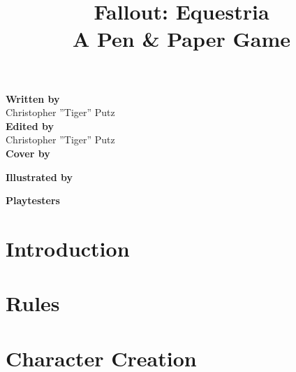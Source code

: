 \documentclass[twocolumn, 12pt]{book}
\title{Fallout: Equestria\\
		\large A Pen \& Paper Game}
\begin{document}
\maketitle

\onecolumn
\begin{center}
\textbf{\large Written by} \\ \normalsize
Christopher ''Tiger'' Putz \\

\vspace{14pt} \textbf{\large Edited by} \\ \normalsize
Christopher ''Tiger'' Putz \\

\vspace{14pt} \textbf{\large Cover by} \\ \normalsize

\vspace{14pt} \textbf{\large Illustrated by} \\ \normalsize

\vspace{14pt} \textbf{\large Playtesters} \\ \normalsize
 
\end{center}

\tableofcontents
\twocolumn
  
\chapter{Introduction}


\chapter{Rules}


\chapter{Character Creation}

\end{document}
